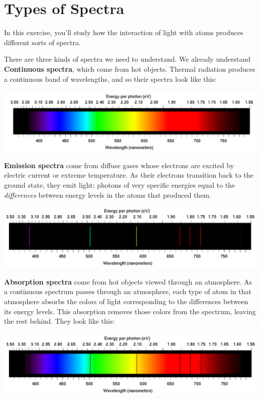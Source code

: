 \documentclass[11pt]{article}
\newcommand{\BC}{\begin{center}}
\newcommand{\EC}{\end{center}}
\begin{document}
\Large
\centerline{}

\normalsize

\section{Types of Spectra}

In this exercise, you'll study how the interaction of light with atoms produces different sorts of spectra.

There are three kinds of spectra we need to understand. We already understand {\bf Continuous spectra}, which come from hot objects. Thermal radiation produces a continuous band of wavelengths, and so their spectra look like this:
	\BC
	\includegraphics[width=6in]{spectrum-continuous.png}
	\EC
	
	
	
	
	{\bf Emission spectra} come from diffuse gases whose electrons are excited by electric current or extreme temperature. As their electrons transition back to the ground state, they emit light: photons of very specific energies equal to the {\it differences} between energy levels in the atoms that produced them.
	
	\BC
		\includegraphics[width=6in]{spectrum-emission.png}
	\EC
	{\bf Absorption spectra} come from hot objects viewed through an atmosphere. As a continuous spectrum passes through an atmosphere, each type of atom in that atmosphere absorbs the colors of light corresponding to the differences between its energy levels. This absorption removes those colors from the spectrum, leaving the rest behind. They look like this:
	\BC
	\includegraphics[width=6in]{spectrum-absorption.png}
	\EC
	
\end{document}
